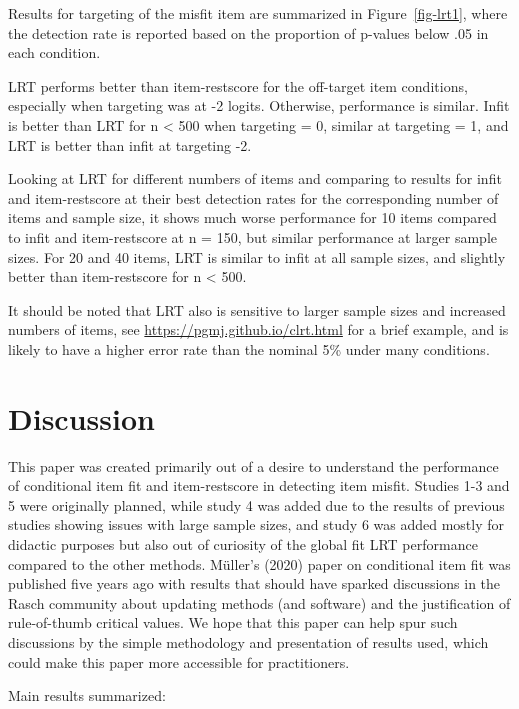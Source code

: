 \documentclass[
  letterpaper,
  DIV=11,
  numbers=noendperiod]{scrartcl}
\begin{document}
Results for targeting of the misfit item are summarized in
Figure~\ref{fig-lrt1}, where the detection rate is reported based on the
proportion of p-values below .05 in each condition.

LRT performs better than item-restscore for the off-target item
conditions, especially when targeting was at -2 logits. Otherwise,
performance is similar. Infit is better than LRT for n \textless{} 500
when targeting = 0, similar at targeting = 1, and LRT is better than
infit at targeting -2.

Looking at LRT for different numbers of items and comparing to results
for infit and item-restscore at their best detection rates for the
corresponding number of items and sample size, it shows much worse
performance for 10 items compared to infit and item-restscore at n =
150, but similar performance at larger sample sizes. For 20 and 40
items, LRT is similar to infit at all sample sizes, and slightly better
than item-restscore for n \textless{} 500.

It should be noted that LRT also is sensitive to larger sample sizes and
increased numbers of items, see \url{https://pgmj.github.io/clrt.html}
for a brief example, and is likely to have a higher error rate than the
nominal 5\% under many conditions.

\section{Discussion}\label{discussion}

This paper was created primarily out of a desire to understand the
performance of conditional item fit and item-restscore in detecting item
misfit. Studies 1-3 and 5 were originally planned, while study 4 was
added due to the results of previous studies showing issues with large
sample sizes, and study 6 was added mostly for didactic purposes but
also out of curiosity of the global fit LRT performance compared to the
other methods. Müller's (2020) paper on conditional item fit was
published five years ago with results that should have sparked
discussions in the Rasch community about updating methods (and software)
and the justification of rule-of-thumb critical values. We hope that
this paper can help spur such discussions by the simple methodology and
presentation of results used, which could make this paper more
accessible for practitioners.

Main results summarized:
\end{document}
